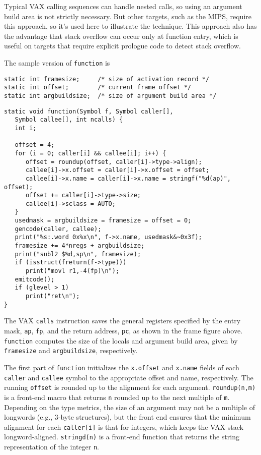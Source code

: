 Typical VAX calling sequences can handle nested calls,
so using an argument build area is not strictly necessary.
But other targets, such as the MIPS, require this approach,
so it's used here to illustrate the technique. This approach also
has the advantage that stack overflow can occur only at function
entry, which is useful on targets that require explicit
prologue code to detect stack overflow.

The sample version of \verb|function| is
\begin{verbatim}
static int framesize;     /* size of activation record */
static int offset;        /* current frame offset */
static int argbuildsize;  /* size of argument build area */

\end{verbatim}
\begin{verbatim}
static void function(Symbol f, Symbol caller[],
   Symbol callee[], int ncalls) {
   int i;

   offset = 4;
   for (i = 0; caller[i] && callee[i]; i++) {
      offset = roundup(offset, caller[i]->type->align);
      callee[i]->x.offset = caller[i]->x.offset = offset;
      callee[i]->x.name = caller[i]->x.name = stringf("%d(ap)", offset);
      offset += caller[i]->type->size;
      callee[i]->sclass = AUTO;
   }
   usedmask = argbuildsize = framesize = offset = 0;
   gencode(caller, callee);
   print("%s:.word 0x%x\n", f->x.name, usedmask&~0x3f);
   framesize += 4*nregs + argbuildsize;
   print("subl2 $%d,sp\n", framesize);
   if (isstruct(freturn(f->type)))
      print("movl r1,-4(fp)\n");
   emitcode();
   if (glevel > 1)
      print("ret\n");
}
\end{verbatim}
The VAX \verb|calls| instruction saves the general registers specified
by the entry mask, \verb|ap|, \verb|fp|,
and the return address, \verb|pc|, as shown in the frame figure above.
\verb|function| computes the size of the locals and argument build area,
given by \verb|framesize| and \verb|argbuildsize|, respectively.

The first part of \verb|function| initializes the \verb|x.offset| and \verb|x.name| fields
of each \verb|caller| and \verb|callee| symbol to the appropriate offset and name, respectively.
The running \verb|offset| is rounded up to the alignment for each argument.
\verb|roundup(n,m)| is a front-end macro that returns \verb|n| rounded up to the
next multiple of \verb|m|. Depending on the type metrics, the size of an
argument may not be a multiple of longwords (e.g., 3-byte structures),
but the front end ensures that the minimum alignment for each \verb|caller[i]|
is that for integers, which keeps the VAX stack longword-aligned.
\verb|stringd(n)| is a front-end function that returns the string
representation of the integer \verb|n|.

